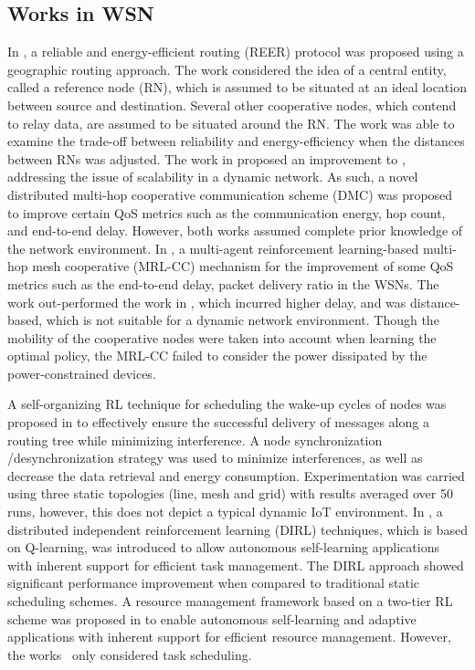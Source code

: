 \documentclass[journal]{IEEEtran}
\begin{document}
\subsection{Works in WSN}

In \cite{Chen2008}, a reliable and energy-efficient routing (REER) protocol was proposed using a geographic routing approach. The work considered the idea of a central entity, called a reference node (RN), which is assumed to be situated at an ideal location between source and destination. Several other cooperative nodes, which contend to relay data, are assumed to be situated around the RN. The work was able to examine the trade-off between reliability and energy-efficiency when the distances between RNs was adjusted. The work in \cite{Chen2011} proposed an improvement to \cite{Chen2008}, addressing the issue of scalability in a dynamic network. As such, a novel distributed multi-hop cooperative communication scheme (DMC) was proposed to improve certain QoS metrics such as the communication energy, hop count, and end-to-end delay. However, both works assumed complete prior knowledge of the network environment.
In \cite{Liang2009}, a multi-agent reinforcement learning-based multi-hop mesh cooperative (MRL-CC) mechanism for the improvement of some QoS metrics such as the end-to-end delay, packet delivery ratio in the WSNs. The work out-performed the work in \cite{Chen2009}, which incurred higher delay, and was distance-based, which is not suitable for a dynamic network environment. Though the mobility of the cooperative nodes were taken into account when learning the optimal policy, the MRL-CC failed to consider the power dissipated by the power-constrained devices.

A self-organizing RL technique for scheduling the wake-up cycles of nodes was proposed in \cite{Mihaylov} to effectively ensure the successful delivery of messages along a routing tree while minimizing interference. A node synchronization /desynchronization strategy was used to minimize interferences, as well as decrease the data retrieval and energy consumption. Experimentation was carried using three static topologies (line, mesh and grid) with results averaged over 50 runs, however, this does not depict a typical dynamic IoT environment. In \cite{Shah2007}, a distributed independent reinforcement learning (DIRL) techniques, which is based on Q-learning, was introduced to allow autonomous self-learning applications with inherent support for efficient task management. The DIRL approach showed significant performance improvement when compared to traditional static scheduling schemes. A resource management framework based on a two-tier RL scheme was proposed in \cite{Shah2013} to enable autonomous self-learning and adaptive applications with inherent support for efficient resource management. However, the works~\cite{Shah2007, Shah2013} only considered task scheduling.
\end{document}
